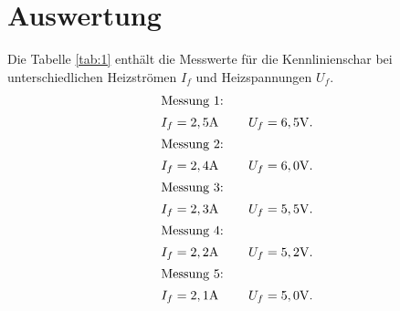 \section{Auswertung}
\label{sec:Auswertung}
Die Tabelle \ref{tab:1} enthält die Messwerte für die Kennlinienschar
bei unterschiedlichen Heizströmen $I_{f}$ und Heizspannungen $U_f$.
\begin{align*}
\intertext{Messung 1:}  I_f&=2,5\si{\ampere} \ \ \ \ &U_f=6,5\si{\volt}.\\
\intertext{Messung 2:}  I_f&=2,4\si{\ampere} \ \ \ \ &U_f=6,0\si{\volt}.\\
\intertext{Messung 3:}  I_f&=2,3\si{\ampere} \ \ \ \ &U_f=5,5\si{\volt}.\\
\intertext{Messung 4:}  I_f&=2,2\si{\ampere} \ \ \ \ &U_f=5,2\si{\volt}.\\
\intertext{Messung 5:}  I_f&=2,1\si{\ampere} \ \ \ \ &U_f=5,0\si{\volt}.
\end{align*}


